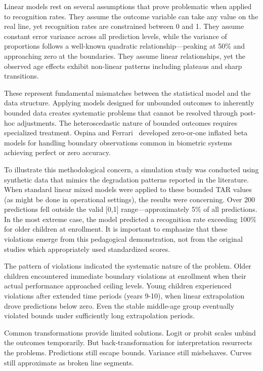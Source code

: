 \documentclass[10pt,journal,compsoc]{IEEEtran}
\begin{document}
Linear models rest on several assumptions that prove problematic when applied to recognition rates. They assume the outcome variable can take any value on the real line, yet recognition rates are constrained between 0 and 1. They assume constant error variance across all prediction levels, while the variance of proportions follows a well-known quadratic relationship---peaking at 50\% and approaching zero at the boundaries. They assume linear relationships, yet the observed age effects exhibit non-linear patterns including plateaus and sharp transitions.

These represent fundamental mismatches between the statistical model and the data structure. Applying models designed for unbounded outcomes to inherently bounded data creates systematic problems that cannot be resolved through post-hoc adjustments. The heteroscedastic nature of bounded outcomes requires specialized treatment. Ospina and Ferrari~\cite{ospina2012} developed zero-or-one inflated beta models for handling boundary observations common in biometric systems achieving perfect or zero accuracy.

To illustrate this methodological concern, a simulation study was conducted using synthetic data that mimics the degradation patterns reported in the literature. When standard linear mixed models were applied to these bounded TAR values (as might be done in operational settings), the results were concerning. Over 200 predictions fell outside the valid [0,1] range---approximately 5\% of all predictions. In the most extreme case, the model predicted a recognition rate exceeding 100\% for older children at enrollment. It is important to emphasize that these violations emerge from this pedagogical demonstration, not from the original studies which appropriately used standardized scores.

The pattern of violations indicated the systematic nature of the problem. Older children encountered immediate boundary violations at enrollment when their actual performance approached ceiling levels. Young children experienced violations after extended time periods (years 9-10), when linear extrapolation drove predictions below zero. Even the stable middle-age group eventually violated bounds under sufficiently long extrapolation periods.

Common transformations provide limited solutions. Logit or probit scales unbind the outcomes temporarily. But back-transformation for interpretation resurrects the problems. Predictions still escape bounds. Variance still misbehaves. Curves still approximate as broken line segments.
\end{document}
